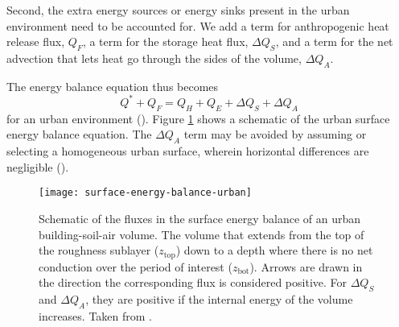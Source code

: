 		Second, the extra energy sources or energy sinks present in the urban environment need to be accounted for.
		We add a term for anthropogenic heat release flux, $Q_F$,
			a term for the storage heat flux, $\Delta Q_S$, and
			a term for the net advection that lets heat go through the sides of the volume, $\Delta Q_A$.
		
		The energy balance equation thus becomes
		\begin{equation}
			Q^* + Q_F= Q_H + Q_E + \Delta Q_S + \Delta Q_A
		\end{equation}
		for an urban environment (\cite{Oke2017urban}).
		Figure \ref{fig:surface-energy-balance-urban} shows a schematic of the urban surface energy balance equation.
		The $\Delta Q_A$ term may be avoided by assuming or selecting a homogeneous urban surface, wherein horizontal differences are negligible (\cite{Oke2017urban}).
		
		\begin{figure}	
			\centering
			\texttt{[image: surface-energy-balance-urban]}
			\caption{
				Schematic of the fluxes in the surface energy balance of an urban building-soil-air volume. 
				The volume that extends from the top of the roughness sublayer ($z_\text{top}$) down to a depth where there is no net conduction over the period of interest ($z_\text{bot}$).
				Arrows are drawn in the direction the corresponding flux is considered positive.
				For $\Delta Q_S$ and $\Delta Q_A$, they are positive if the internal energy of the volume increases.
				Taken from \textcite{Oke2017urban}.
			}
			\label{fig:surface-energy-balance-urban}
		\end{figure}
	



